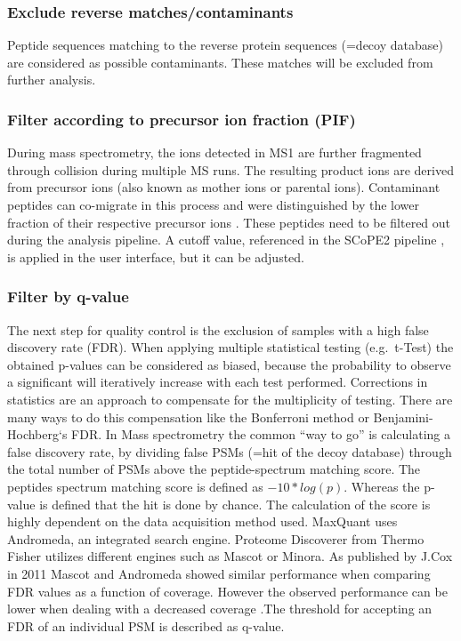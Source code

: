 \documentclass[
  11pt,
]{article}
\begin{document}
\hypertarget{exclude-reverse-matchescontaminants}{%
\subsubsection{Exclude reverse
matches/contaminants}\label{exclude-reverse-matchescontaminants}}

Peptide sequences matching to the reverse protein sequences (=decoy
database) are considered as possible contaminants. These matches will be
excluded from further analysis.

\hypertarget{filter-according-to-precursor-ion-fraction-pif}{%
\subsubsection{Filter according to precursor ion fraction
(PIF)}\label{filter-according-to-precursor-ion-fraction-pif}}

During mass spectrometry, the ions detected in MS1 are further
fragmented through collision during multiple MS runs. The resulting
product ions are derived from precursor ions (also known as mother ions
or parental ions). Contaminant peptides can co-migrate in this process
and were distinguished by the lower fraction of their respective
precursor ions \citep{Tannous2020}. These peptides need to be filtered
out during the analysis pipeline. A cutoff value, referenced in the
SCoPE2 pipeline \citep{Specht2021}, is applied in the user interface,
but it can be adjusted.

\hypertarget{filter-by-q-value}{%
\subsubsection{Filter by q-value}\label{filter-by-q-value}}

The next step for quality control is the exclusion of samples with a
high false discovery rate (FDR). When applying multiple statistical
testing (e.g.~t-Test) the obtained p-values can be considered as biased,
because the probability to observe a significant will iteratively
increase with each test performed. Corrections in statistics are an
approach to compensate for the multiplicity of testing. There are many
ways to do this compensation like the Bonferroni method or
Benjamini-Hochberg`s FDR. In Mass spectrometry the common ``way to go''
is calculating a false discovery rate, by dividing false PSMs (=hit of
the decoy database) through the total number of PSMs above the
peptide-spectrum matching score. The peptides spectrum matching score is
defined as \(-10 * log(p)\). Whereas the p-value is defined that the hit
is done by chance. The calculation of the score is highly dependent on
the data acquisition method used. MaxQuant uses Andromeda, an integrated
search engine. Proteome Discoverer from Thermo Fisher utilizes different
engines such as Mascot or Minora. As published by J.Cox in 2011 Mascot
and Andromeda showed similar performance when comparing FDR values as a
function of coverage. However the observed performance can be lower when
dealing with a decreased coverage \citep{Cox2011}.The threshold for
accepting an FDR of an individual PSM is described as q-value.
\end{document}
